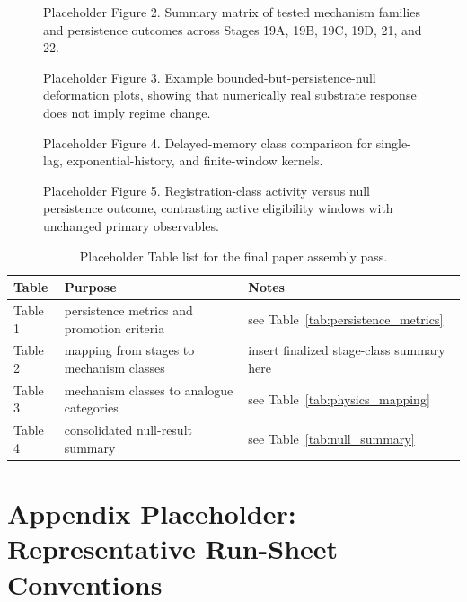 \documentclass[11pt]{article}
\newcommand{\placeholderbox}[1]{%
  \fbox{\rule{0pt}{#1}\rule{0.92\linewidth}{0pt}}%
}
\begin{document}
\begin{figure}[h]
\centering
\placeholderbox{1.8in}
\caption{Placeholder Figure 2. Summary matrix of tested mechanism families and persistence outcomes across Stages 19A, 19B, 19C, 19D, 21, and 22.}
\label{fig:summary_matrix}
\end{figure}

\begin{figure}[h]
\centering
\placeholderbox{1.8in}
\caption{Placeholder Figure 3. Example bounded-but-persistence-null deformation plots, showing that numerically real substrate response does not imply regime change.}
\label{fig:bounded_null}
\end{figure}

\begin{figure}[h]
\centering
\placeholderbox{1.8in}
\caption{Placeholder Figure 4. Delayed-memory class comparison for single-lag, exponential-history, and finite-window kernels.}
\label{fig:memory_comparison}
\end{figure}

\begin{figure}[h]
\centering
\placeholderbox{1.8in}
\caption{Placeholder Figure 5. Registration-class activity versus null persistence outcome, contrasting active eligibility windows with unchanged primary observables.}
\label{fig:registration_null}
\end{figure}

\begin{table}[h]
\centering
\small
\begin{tabular}{@{}p{1.2in}p{1.8in}p{2.6in}@{}}
\toprule
Table & Purpose & Notes \\
\midrule
Table 1 & persistence metrics and promotion criteria & see Table~\ref{tab:persistence_metrics} \\
Table 2 & mapping from stages to mechanism classes & insert finalized stage-class summary here \\
Table 3 & mechanism classes to analogue categories & see Table~\ref{tab:physics_mapping} \\
Table 4 & consolidated null-result summary & see Table~\ref{tab:null_summary} \\
\bottomrule
\end{tabular}
\caption{Placeholder Table list for the final paper assembly pass.}
\end{table}

\appendix

\section{Appendix Placeholder: Representative Run-Sheet Conventions}
\end{document}
